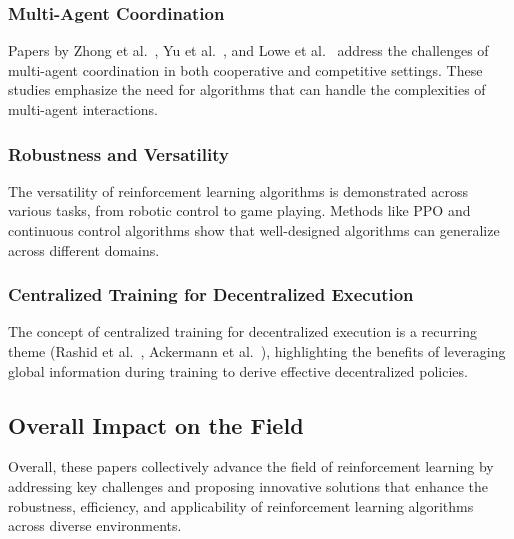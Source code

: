 \documentclass[journal]{IEEEtran}
\begin{document}
\subsubsection{Multi-Agent Coordination} 
Papers by Zhong et al.~\cite{zhong2024}, Yu et al.~\cite{yu2022}, and Lowe et al.~\cite{lowe2020}
address the challenges of multi-agent coordination in both cooperative and competitive settings. 
These studies emphasize the need for algorithms that can handle the complexities of 
multi-agent interactions.

\subsubsection{Robustness and Versatility} 
The versatility of reinforcement learning algorithms is demonstrated across various tasks, 
from robotic control to game playing. Methods like PPO and continuous control algorithms show 
that well-designed algorithms can generalize across different domains.

\subsubsection{Centralized Training for Decentralized Execution} 
The concept of centralized training for decentralized execution is a recurring theme 
(Rashid et al.~\cite{rashid2018}, Ackermann et al.~\cite{ackermann2019}), highlighting the benefits
of leveraging global information during training to derive effective decentralized policies.

\subsection{Overall Impact on the Field}
Overall, these papers collectively advance the field of reinforcement learning by addressing key 
challenges and proposing innovative solutions that enhance the robustness, efficiency, and 
applicability of reinforcement learning algorithms across diverse environments.

\label{sec:references}
\printbibliography

\end{document}
